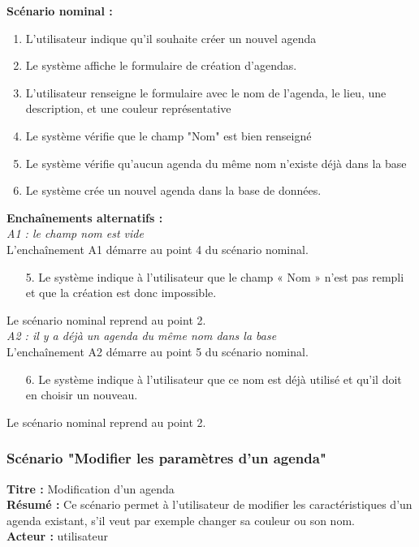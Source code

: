 \documentclass[12pt , a4paper]{article}
\begin{document}
\noindent\textbf{Scénario nominal :}
\begin{enumerate}
\item L’utilisateur indique qu'il souhaite créer un nouvel agenda 
\item Le système affiche le formulaire de création d’agendas.
\item L'utilisateur renseigne le formulaire avec le nom de l'agenda, le lieu, une description, et une couleur représentative
\item Le système vérifie que le champ "Nom" est bien renseigné
\item Le système vérifie qu’aucun agenda du même nom n’existe déjà dans la base
\item Le système crée un nouvel agenda dans la base de données.\\
\end{enumerate}


\noindent\textbf{Encha\^inements alternatifs :}\\
\noindent\textit{A1 : le champ nom est vide}\\
L'encha\^inement A1 démarre au point 4 du scénario nominal.
\begin{enumerate}
\item[5.] Le système indique à l’utilisateur que le champ « Nom » n’est pas rempli et que la création est donc impossible.
\end{enumerate}
Le scénario nominal reprend au point 2.\\


\noindent\textit{A2 : il y a déjà un agenda du même nom dans la base}\\
L'encha\^inement A2 démarre au point 5 du scénario nominal.
\begin{enumerate}
\item[6.] Le système indique à l’utilisateur que ce nom est déjà utilisé et qu’il doit en choisir un nouveau.
\end{enumerate}
Le scénario nominal reprend au point 2.\\


\subsubsection{Scénario "Modifier les paramètres d'un agenda"}
\noindent\textbf{Titre : } Modification d’un agenda\\
\textbf{Résumé : } Ce scénario permet à l’utilisateur de modifier les caractéristiques d’un agenda existant, s’il veut par exemple changer sa couleur ou son nom.\\
\textbf{Acteur : }utilisateur\\
\end{document}
